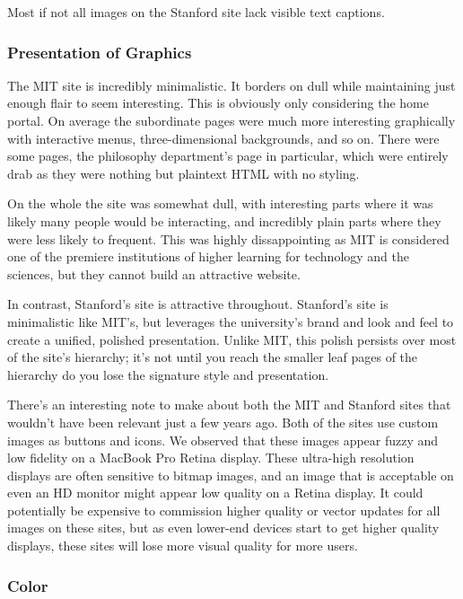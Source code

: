 Most if not all images on the Stanford site lack visible text captions.

\subsubsection*{Presentation of Graphics}

The MIT site is incredibly minimalistic. It borders on dull while maintaining just enough flair
to seem interesting. This is obviously only considering the home portal. On average the
subordinate pages were much more interesting graphically with interactive menus,
three-dimensional backgrounds, and so on. There were some pages, the philosophy department's
page in particular, which were entirely drab as they were nothing but plaintext HTML with no
styling.

On the whole the site was somewhat dull, with interesting parts where it was likely many
people would be interacting, and incredibly plain parts where they were less likely to
frequent. This was highly dissappointing as MIT is considered one of the premiere
institutions of higher learning for technology and the sciences, but they cannot build an
attractive website.

In contrast, Stanford's site is attractive throughout. Stanford's site is minimalistic
like MIT's, but leverages the university's brand and look and feel to create a unified,
polished presentation. Unlike MIT, this polish persists over most of the site's
hierarchy; it's not until you reach the smaller leaf pages of the hierarchy do you
lose the signature style and presentation.

There's an interesting note to make about both the MIT and Stanford sites that wouldn't
have been relevant just a few years ago. Both of the sites use custom images as buttons
and icons. We observed that these images appear fuzzy and low fidelity on a MacBook
Pro Retina display. These ultra-high resolution displays are often sensitive to
bitmap images, and an image that is acceptable on even an HD monitor might appear
low quality on a Retina display. It could potentially be expensive to commission
higher quality or vector updates for all images on these sites, but as even lower-end
devices start to get higher quality displays, these sites will lose more visual
quality for more users.

\subsubsection*{Color}

